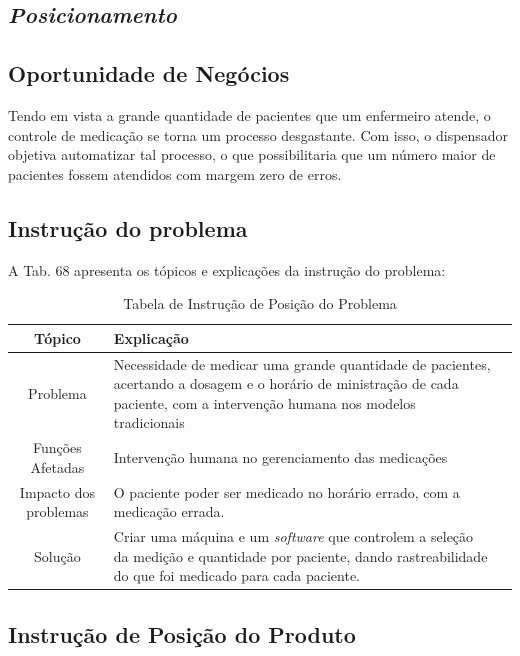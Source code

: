 \begin{apendicesenv}
\section{\textit{Posicionamento}}
\subsection*{Oportunidade de Negócios}

Tendo em vista a grande quantidade de pacientes que um enfermeiro atende, o controle de medicação se torna um processo desgastante. Com isso, o dispensador objetiva automatizar tal processo, o que possibilitaria que um número maior de pacientes fossem atendidos com margem zero de erros.

\subsection*{Instrução do problema}

A Tab. 68 apresenta os tópicos e explicações da instrução do problema: 

\begin{table}[H]
    \centering
    \caption{Tabela de Instrução de Posição do Problema}
    \begin{tabularx}{\textwidth}{|c|X|c|}
        \hline
        \rowcolor[HTML]{A8DADC}
        \textbf{Tópico} & \textbf{Explicação} \\ \hline
        
        Problema & Necessidade de medicar uma grande quantidade de pacientes, acertando a dosagem e o horário de ministração de cada paciente, com a intervenção humana nos modelos tradicionais \\\hline
        
        Funções Afetadas & Intervenção humana no gerenciamento das medicações \\ \hline
        
        Impacto dos problemas & O paciente poder ser medicado no horário errado, com a medicação errada. \\ \hline
        
        Solução & Criar uma máquina e um \textit{software} que controlem a seleção da medição e quantidade por paciente, dando rastreabilidade do que foi medicado para cada paciente.\\ \hline
    \end{tabularx}
\end{table}

\subsection*{Instrução de Posição do Produto}


\end{apendicesenv}
